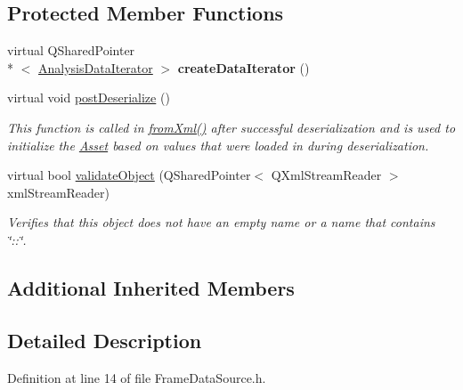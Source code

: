 \subsection*{Protected Member Functions}
\begin{DoxyCompactItemize}
\item 
\hypertarget{class_picto_1_1_frame_data_source_a1804f2e41810093ba267664e8d008af1}{virtual Q\-Shared\-Pointer\\*
$<$ \hyperlink{class_picto_1_1_analysis_data_iterator}{Analysis\-Data\-Iterator} $>$ {\bfseries create\-Data\-Iterator} ()}\label{class_picto_1_1_frame_data_source_a1804f2e41810093ba267664e8d008af1}

\item 
virtual void \hyperlink{class_picto_1_1_frame_data_source_a4e96fe48935f89dadedb100fd35ef9f6}{post\-Deserialize} ()
\begin{DoxyCompactList}\small\item\em This function is called in \hyperlink{class_picto_1_1_asset_a8bed4da09ecb1c07ce0dab313a9aba67}{from\-Xml()} after successful deserialization and is used to initialize the \hyperlink{class_picto_1_1_asset}{Asset} based on values that were loaded in during deserialization. \end{DoxyCompactList}\item 
\hypertarget{class_picto_1_1_frame_data_source_a6f47e262d35d3a9d9034303fec703663}{virtual bool \hyperlink{class_picto_1_1_frame_data_source_a6f47e262d35d3a9d9034303fec703663}{validate\-Object} (Q\-Shared\-Pointer$<$ Q\-Xml\-Stream\-Reader $>$ xml\-Stream\-Reader)}\label{class_picto_1_1_frame_data_source_a6f47e262d35d3a9d9034303fec703663}

\begin{DoxyCompactList}\small\item\em Verifies that this object does not have an empty name or a name that contains \char`\"{}\-::\char`\"{}. \end{DoxyCompactList}\end{DoxyCompactItemize}
\subsection*{Additional Inherited Members}


\subsection{Detailed Description}


Definition at line 14 of file Frame\-Data\-Source.\-h.



